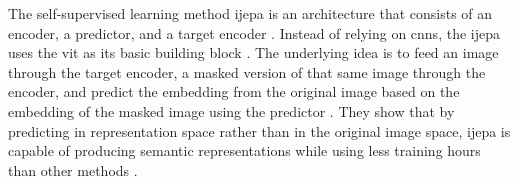The self-supervised learning method \gls{ijepa} is an architecture that consists of an encoder, a predictor, and a 
target encoder \cite{assran_self-supervised_2023}. Instead of relying on \glspl{cnn}, the \gls{ijepa} uses 
the \gls{vit} \cite{dosovitskiy_image_2021} as its basic building block \cite{assran_self-supervised_2023}. 
The underlying idea is to feed an image through the target encoder,
a masked version of that same image through the encoder, and predict the embedding from the original image based 
on the embedding of the masked image using the predictor \cite{assran_self-supervised_2023}. They show that 
by predicting in representation space rather than in the original image space, \gls{ijepa} is capable of 
producing semantic representations while using less training hours than other methods \cite{assran_self-supervised_2023}.

